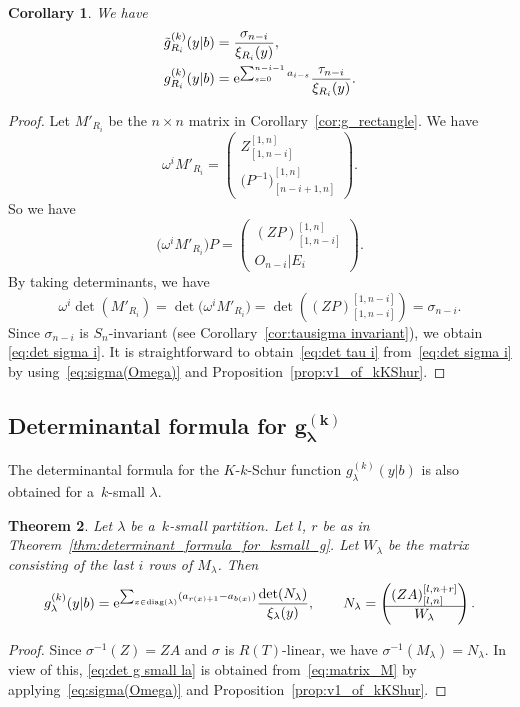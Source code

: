 \documentclass[pdftex]{sigma}
\numberwithin{equation}{section}
\newcommand{\co}{\xi}
\newcommand{\la}{\lambda}
\newcommand{\Rep}{{R(T)}}
\newtheorem{Theorem}{Theorem}[section]
\newtheorem{Corollary}[Theorem]{Corollary}
\theoremstyle{definition}
\begin{document}
\begin{Corollary}\label{cor:k rect and tau}
We have
 \begin{align}
 \tilde{g}^{(k)}_{R_i}(y|b)&=
 \frac{\sigma_{n-i}}{\co_{R_i}(y)},\label{eq:det sigma i}
 \\ g^{(k)}_{R_i}(y|b)&=
{\rm e}^{\sum_{s=0}^{n-i-1}a_{i-s}}
 \frac{
 \tau_{n-i}}{\co_{R_i}(y)}.\label{eq:det tau i}\end{align}
\end{Corollary}
\begin{proof}
Let $M'_{R_i}$ be the $n\times n$ matrix in Corollary~\ref{cor:g_rectangle}. We have
\[
\omega^{i}M'_{R_i}=
\left(
\begin{matrix}
Z_{[1,n-i]}^{[1,n]}\\\hline
{
\bigl(P^{-1}\bigr)}^{[1,n]}_{[n-i+1,n]}
\end{matrix}
\right).
\]
So we have
\[
\bigl(\omega^{i}M'_{R_i}\bigr)P=
\left(
\begin{matrix}
(ZP)_{[1,n-i]}^{[1,n]}\\
\hline
O_{n-i}|E_{i}
\end{matrix}
\right).
\]
By taking determinants, we have
\[
\omega^{i}\det(M'_{R_i})
=\det\bigl(\omega^{i}M'_{R_i}\bigr)=\det\left((ZP)^{[1,n-i]}_{[1,n-i]}\right)=\sigma_{n-i}.
\]
Since $\sigma_{n-i}$ is $S_n$-invariant (see Corollary~\ref{cor:tausigma invariant}), we obtain
\eqref{eq:det sigma i}.
%
It is straightforward to obtain~\eqref{eq:det tau i} from~\eqref{eq:det sigma i}
by using~\eqref{eq:sigma(Omega)} and
Proposition~\ref{prop:v1_of_kKShur}.
\end{proof}



\subsection[Determinantal formula for g\^{}(k)\_lambda]{Determinantal formula for $\boldsymbol{g^{(k)}_\lambda}$}

The determinantal formula for the $K$-$k$-Schur function $g^{(k)}_\lambda(y|b)$ is also obtained for a~$k$-small $\lambda$.
\begin{Theorem}\label{thm:determinantal_formula_for_g}
Let $\lambda$ be a~$k$-small partition.
Let $l$, $r$ be as in Theorem~{\rm\ref{thm:determinant_formula_for_ksmall_g}}.
Let $W_\la$ be the matrix consisting of the last $i$ rows of $M_{\la}$.
Then \begin{equation}
g^{(k)}_{\lambda}(y|b)
={\rm e}^{\sum_{x\in \mathrm{diag}(\lambda)}(a_{r(x)+1}-a_{b(x)})}
\frac{\det(N_\lambda)}{\co_\la(y)},\qquad
N_\lambda=
\left(
\begin{matrix}
 (ZA)_{[l,n]}^{[l,n+r]} \\ \hline
 W_{\la}
\end{matrix}
\right).
\label{eq:det g small la}
\end{equation}
\end{Theorem}
\begin{proof} Since $\sigma^{-1}(Z)=ZA$ and $\sigma$ is $\Rep$-linear, we have
$\sigma^{-1}(M_\la)=N_\la.
$ In view of this,
\eqref{eq:det g small la}
is obtained from~\eqref{eq:matrix_M} by applying~\eqref{eq:sigma(Omega)} and Proposition~\ref{prop:v1_of_kKShur}.
\end{proof}
\end{document}
